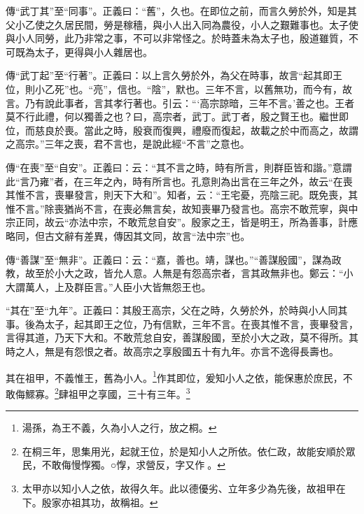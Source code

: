 {\noindent\zhuan{}\fzbyks 傳“武丁其”至“同事”。正義曰：“舊”，久也。在即位之前，而言久勞於外，知是其父小乙使之久居民間，勞是稼穡，與小人出入同為農役，小人之艱難事也。太子使與小人同勞，此乃非常之事，不可以非常怪之。於時蓋未為太子也，殷道雖質，不可既為太子，更得與小人雜居也。 \par}

{\noindent\zhuan{}\fzbyks 傳“武丁起”至“行著”。正義曰：以上言久勞於外，為父在時事，故言“起其即王位，則小乙死”也。“亮”，信也。“陰”，默也。三年不言，以舊無功，而今有，故言。乃有說此事者，言其孝行著也。引云：“‘高宗諒暗，三年不言。’善之也。王者莫不行此禮，何以獨善之也？曰，高宗者，武丁。武丁者，殷之賢王也。繼世即位，而慈良於喪。當此之時，殷衰而復興，禮廢而復起，故載之於中而高之，故謂之高宗。”三年之喪，君不言也，是說此經“不言”之意也。 \par}

{\noindent\zhuan{}\fzbyks 傳“在喪”至“自安”。正義曰：云：“其不言之時，時有所言，則群臣皆和諧。”意謂此“言乃雍”者，在三年之內，時有所言也。孔意則為出言在三年之外，故云“在喪其惟不言，喪畢發言，則天下大和”。知者，云：“王宅憂，亮陰三祀。既免喪，其惟不言。”除喪猶尚不言，在喪必無言矣，故知喪畢乃發言也。高宗不敢荒寧，與中宗正同，故云“亦法中宗，不敢荒怠自安”。殷家之王，皆是明王，所為善事，計應略同，但古文辭有差異，傳因其文同，故言“法中宗”也。 \par}

{\noindent\zhuan{}\fzbyks 傳“善謀”至“無非”。正義曰：云：“嘉，善也。靖，謀也。”“善謀殷國”，謀為政教，故至於小大之政，皆允人意。人無是有怨高宗者，言其政無非也。鄭云：“小大謂萬人，上及群臣言。”人臣小大皆無怨王也。 \par}

{\noindent\shu{}\fzkt “其在”至“九年”。正義曰：其殷王高宗，父在之時，久勞於外，於時與小人同其事。後為太子，起其即王之位，乃有信默，三年不言。在喪其惟不言，喪畢發言，言得其道，乃天下大和。不敢荒怠自安，善謀殷國，至於小大之政，莫不得所。其時之人，無是有怨恨之者。故高宗之享殷國五十有九年。亦言不逸得長壽也。 \par}

其在祖甲，不義惟王，舊為小人。\footnote{湯孫，為王不義，久為小人之行，放之桐。}作其即位，爰知小人之依，能保惠於庶民，不敢侮鰥寡。\footnote{在桐三年，思集用光，起就王位，於是知小人之所依。依仁政，故能安順於眾民，不敢侮慢惸獨。○惸，求營反，字又作𦬮。}肆祖甲之享國，三十有三年。\footnote{太甲亦以知小人之依，故得久年。此以德優劣、立年多少為先後，故祖甲在下。殷家亦祖其功，故稱祖。}



